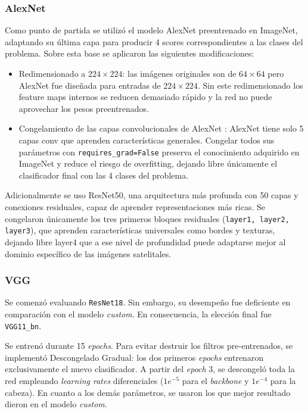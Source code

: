 \documentclass[11pt, a4paper]{article}
\begin{document}
\subsubsection{AlexNet}
Como punto de partida se utilizó el modelo AlexNet preentrenado en ImageNet, adaptando su última capa para producir 4 scores correspondientes a las clases del problema. Sobre esta base se aplicaron las siguientes modificaciones:
\begin{itemize}
  \item Redimensionado a $224 \times 224$: las imágenes originales son de $64\times64$ pero AlexNet fue diseñada para entradas de $224\times224$. Sin este redimensionado los feature maps internos se reducen demasiado rápido y la red no puede aprovechar los pesos preentrenados.
  \item Congelamiento de las capas convolucionales de AlexNet : AlexNet tiene solo 5 capas conv que aprenden características generales. Congelar todos sus parámetros con \texttt{requires\_grad=False} preserva el conocimiento adquirido en ImageNet y reduce el riesgo de overfitting, dejando libre únicamente el clasificador final con las 4 clases del problema.
\end{itemize}

    Adicionalmente se uso ResNet50, una arquitectura más profunda con 50 capas y conexiones residuales, capaz de aprender representaciones más ricas. Se congelaron únicamente los tres primeros bloques residuales (\texttt{layer1, layer2, layer3}), que aprenden características universales como bordes y texturas, dejando libre layer4 que a ese nivel de profundidad puede adaptarse mejor al dominio específico de las imágenes satelitales.

\subsubsection{VGG}

Se comenzó evaluando \texttt{ResNet18}. Sin embargo, su desempeño fue deficiente en comparación con el modelo \textit{custom}. En consecuencia, la elección final fue \texttt{VGG11\_bn}.

Se entrenó durante 15 \textit{epochs}. Para evitar destruir los filtros pre-entrenados, se implementó Descongelado Gradual: los dos primeros \textit{epochs} entrenaron exclusivamente el nuevo clasificador. A partir del \textit{epoch} 3, se descongeló toda la red empleando \textit{learning rates} diferenciales ($1e^{-5}$ para el \textit{backbone} y $1e^{-4}$ para la cabeza). En cuanto a los demás parámetros, se usaron los que mejor resultado dieron en el modelo \textit{custom}.
\end{document}
